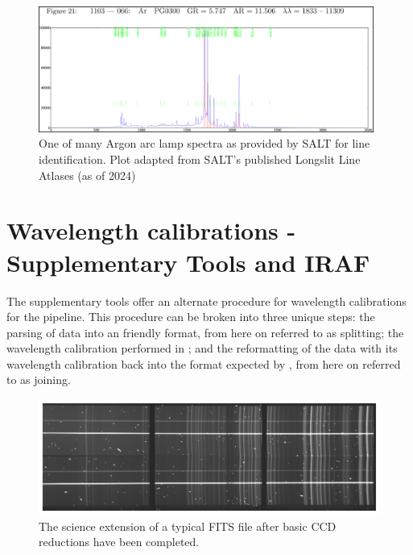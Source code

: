 \begin{figure}[t]
    \centering
    \includegraphics[width = 0.98\textwidth]{figures/3_arc_spectrum.png}
    \caption{One of many Argon arc lamp spectra as provided by \gls{SALT} for line identification. Plot adapted from \gls{SALT}'s published Longslit Line Atlases (as of 2024)\protect\footnotemark}
    \label{fig:ar_arc_salt}
\end{figure}


\section{Wavelength calibrations - Supplementary Tools and IRAF} \label{sec:mod_tools}

The supplementary tools offer an alternate procedure for wavelength calibrations for the \polsalt pipeline. This procedure can be broken into three unique steps: the parsing of \polsalt data into an \iraf friendly format, from here on referred to as splitting; the wavelength calibration performed in \iraf; and the reformatting of the data with its wavelength calibration back into the format expected by \polsalt, from here on referred to as joining.

\begin{figure}[t]
    \centering
    \includegraphics[width = 1.0\textwidth]{figures/3_pre_wav_cal.pdf}
    \caption{The science extension of a typical \polsalt \acs{FITS} file after basic \gls{CCD} reductions have been completed.}
    \label{fig:polsalt_pre_wav_cal}
\end{figure}


